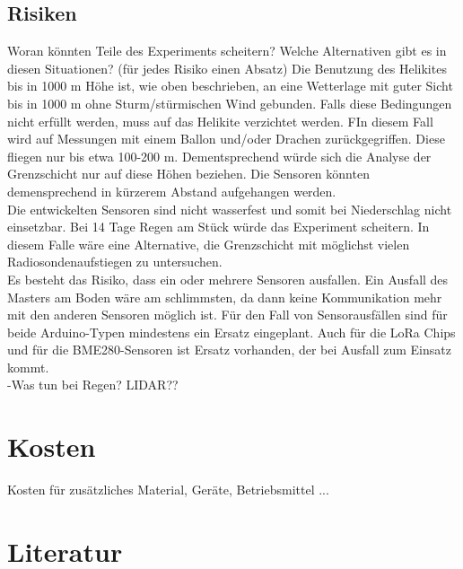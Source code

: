 \documentclass[a4paper,11pt,DIV=calc,tablecaptionabove,headinclude,twoside]{article}
\begin{document}
\subsection{Risiken}
Woran könnten Teile des Experiments scheitern? Welche Alternativen gibt es in diesen Situationen? (für jedes Risiko einen Absatz)
Die Benutzung des Helikites bis in 1000 m Höhe ist, wie oben beschrieben, an eine
Wetterlage mit guter Sicht bis in 1000 m ohne Sturm/stürmischen Wind gebunden. Falls diese Bedingungen nicht erfüllt werden, muss
auf das Helikite verzichtet werden. FIn diesem Fall wird auf Messungen mit einem Ballon und/oder Drachen 
zurückgegriffen. Diese fliegen nur bis etwa 100-200 m. Dementsprechend würde sich die Analyse der Grenzschicht 
nur auf diese Höhen beziehen. Die Sensoren könnten demensprechend in kürzerem Abstand aufgehangen werden.\\
Die entwickelten Sensoren sind nicht wasserfest und somit bei Niederschlag nicht einsetzbar. Bei 14 Tage Regen am Stück
würde das Experiment scheitern. In diesem Falle wäre eine Alternative, die Grenzschicht mit möglichst vielen Radiosondenaufstiegen
zu untersuchen. \\
Es besteht das Risiko, dass ein oder mehrere Sensoren ausfallen. Ein Ausfall des Masters am Boden wäre am
schlimmsten, da dann keine Kommunikation mehr mit den anderen Sensoren möglich ist. Für den Fall von 
Sensorausfällen sind für beide Arduino-Typen mindestens ein Ersatz eingeplant. Auch für die LoRa Chips und für
die BME280-Sensoren ist Ersatz vorhanden, der bei Ausfall zum Einsatz kommt.\\

-Was tun bei Regen? LIDAR??
\section{Kosten}
Kosten für zusätzliches Material, Geräte, Betriebsmittel ...

\section*{Literatur}

\end{document}
